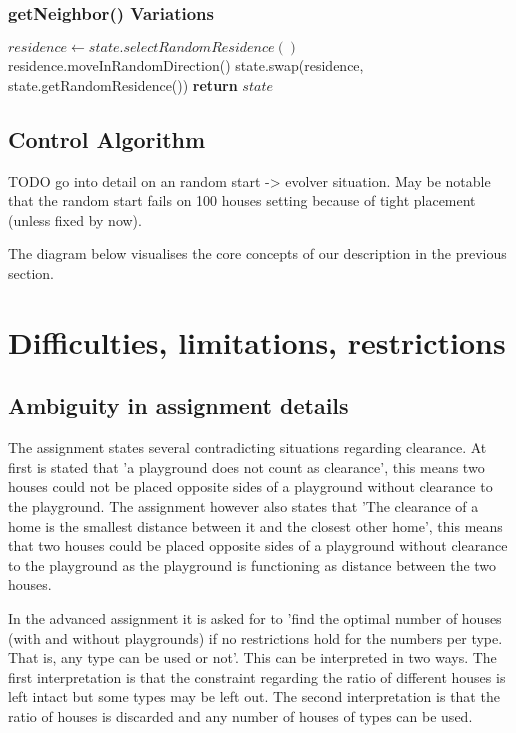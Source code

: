 \documentclass{article}
\begin{document}
\subsubsection{getNeighbor() Variations}
    \begin{algorithmic}
            \State $residence \gets state.selectRandomResidence()$
               \State residence.moveInRandomDirection()
            \Else
                \State state.swap(residence, state.getRandomResidence())
            \EndIf
            \State \textbf{return} $state$
            \EndProcedure
    \end{algorithmic}

\pagebreak

\subsection{Control Algorithm}

TODO go into detail on an random start -> evolver situation. May be notable that the random start fails on 100 houses setting because of tight placement (unless fixed by now).

The diagram below visualises the core concepts of our description in the previous section.


\section{Difficulties, limitations, restrictions}

\subsection{Ambiguity in assignment details}

The assignment states several contradicting situations regarding clearance. At first is stated that 'a playground does not count as clearance', this means two houses could not be placed opposite sides of a playground without clearance to the playground. The assignment however also states that 'The clearance of a home is the smallest distance between it and the closest other home', this means that two houses could be placed opposite sides of a playground without clearance to the playground as the playground is functioning as distance between the two houses.

In the advanced assignment it is asked for to 'find the optimal number of houses (with and without playgrounds) if no restrictions hold for the numbers per type. That is, any type can be used or not'. This can be interpreted in two ways. The first interpretation is that the constraint regarding the ratio of different houses is left intact but some types may be left out. The second interpretation is that the ratio of houses is discarded and any number of houses of types can be used.
\end{document}

